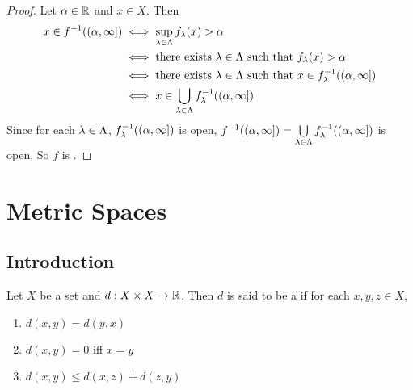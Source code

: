 \documentclass{book}
\begin{document}
	\begin{proof}
		Let $\alpha \in \mathbb{R}$ and $x \in X$. Then 
		\begin{align*}
			x \in f^{-1}((\alpha, \infty])
			& \iff \sup_{\lambda \in \Lambda} f_{\lambda}(x) > \alpha \\
			& \iff \text{there exists $\lambda \in \Lambda$ such that } f_{\lambda}(x) > \alpha \\
			& \iff \text{there exists $\lambda \in \Lambda$ such that } x \in f_{\lambda}^{-1}((\alpha, \infty]) \\
			& \iff x \in \bigcup_{\lambda \in \Lambda} f_{\lambda}^{-1}((\alpha, \infty])
		\end{align*}
		Since for each $\lambda \in \Lambda$, $f_{\lambda}^{-1}((\alpha, \infty])$ is open, $f^{-1}((\alpha, \infty]) = \bigcup\limits_{\lambda \in \Lambda} f_{\lambda}^{-1}((\alpha, \infty])$ is open. So $f$ is \lsc.
	\end{proof}





































\newpage
\chapter{Metric Spaces}
\section{Introduction}
\begin{defn} \ld{}
	Let $X$ be a set and $d: X \times X \rightarrow \mathbb{R}$. Then $d$ is said to be a  if for each $x,y,z \in X$, 
	\begin{enumerate}
		\item $d(x,y) = d(y,x)$
		\item $d(x,y) = 0$ iff $x = y$
		\item $d(x, y) \leq d(x, z) + d(z, y)$
	\end{enumerate}	 
\end{defn}	
\end{document}

